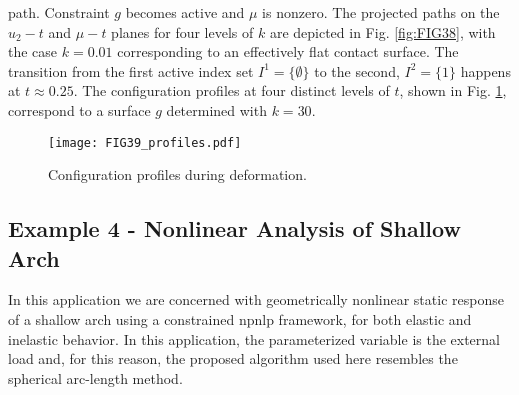 path. Constraint $g$ becomes active and $\mu$ is nonzero. The projected paths
on the $u_2-t$ and $\mu-t$ planes for four levels of $k$ are
depicted in Fig. \ref{fig:FIG38}, with the case $k=0.01$ corresponding to an 
effectively
flat contact surface. The transition from the first active index set
$I^1=\{\emptyset\}$ to the second, $I^2=\{1\}$ happens at $t\approx 0.25$.
The configuration profiles at four distinct levels of $t$, shown in
Fig. \ref{fig:FIG39_Profiles}, correspond to a surface $g$ determined with 
$k=30$.
\begin{figure*}[t]
	\centering
	\qquad
	\caption{Projection of path \textbf{(a)} on $u_2-t$ plane and
		\textbf{(b)} $\mu-t$ plane.}%
	\label{fig:FIG38}%
\end{figure*}
\begin{figure}[b!]
	\centering
	\texttt{[image: FIG39\_profiles.pdf]}
	\caption{Configuration profiles during deformation.}
	\label{fig:FIG39_Profiles}
\end{figure}


\subsection{Example 4 - Nonlinear Analysis of Shallow Arch}

In this application we are concerned with geometrically 
nonlinear static response 
of a shallow arch using a constrained \acrshort{npnlp} framework, for both 
elastic and inelastic behavior. In this application, the parameterized variable 
is the external load and, for this reason, the 
proposed algorithm used here resembles the spherical arc-length 
method\cite{Crisfield3}.

